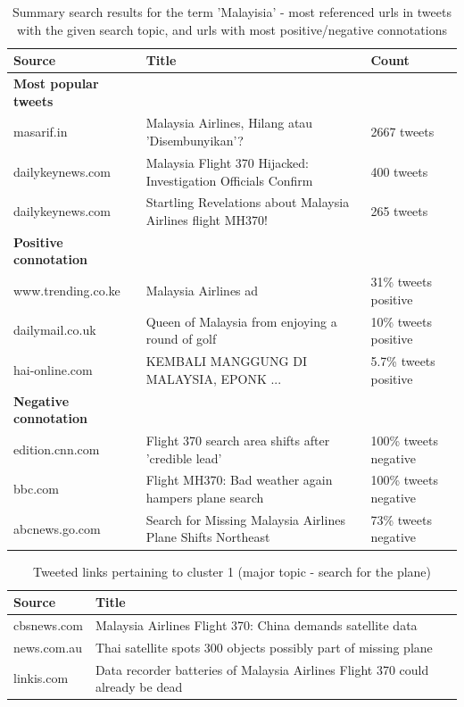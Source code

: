 \documentclass{acm_proc_10ptArticle-sp}
\begin{document}
\begin{table}[!ht]
  \centering
  \caption{Summary search results for the term 'Malayisia' - most referenced urls in tweets with the given search topic, and urls with most positive/negative connotations}
    \label{table:summaryresults}
    \begin{tabular}{| l | l | l |}
	Source & Title & Count  \\ \hline
	\textbf{Most popular tweets} & \multicolumn{2}{c}{}  \\ \hline 
   masarif.in & Malaysia Airlines, Hilang atau 'Disembunyikan'? & 2667 tweets  \\ 
   dailykeynews.com & Malaysia Flight 370 Hijacked: Investigation Officials Confirm & 400 tweets \\
   dailykeynews.com & Startling Revelations about Malaysia Airlines flight MH370! & 265 tweets \\
  \textbf{Positive connotation} & \multicolumn{2}{c}{} \\ \hline 
   www.trending.co.ke & Malaysia Airlines ad &31\% tweets positive \\
   dailymail.co.uk & Queen of Malaysia from enjoying a round of golf & 10\% tweets positive  \\ 
   hai-online.com & KEMBALI MANGGUNG DI MALAYSIA, EPONK ... & 5.7\% tweets positive \\
   \textbf{Negative connotation} & \multicolumn{2}{c}{} \\ \hline 
   edition.cnn.com & Flight 370 search area shifts after 'credible lead' & 100\% tweets negative \\
   bbc.com & Flight MH370: Bad weather again hampers plane search & 100\% tweets negative \\
   abcnews.go.com & Search for Missing Malaysia Airlines Plane Shifts Northeast & 73\% tweets negative \\
  \end{tabular}
\end{table}

\begin{table}[!ht]
  \centering
  \caption{Tweeted links pertaining to cluster 1 (major topic - search for the plane)}
    \label{table:linkscluster1}
    \begin{tabular}{| l | l |}
	Source & Title \\ \hline
cbsnews.com & Malaysia Airlines Flight 370: China demands satellite data\\
news.com.au & Thai satellite spots 300 objects possibly part of missing plane\\
linkis.com & Data recorder batteries of Malaysia Airlines Flight 370 could already be dead\\
  \end{tabular}
\end{table}
\end{document}
